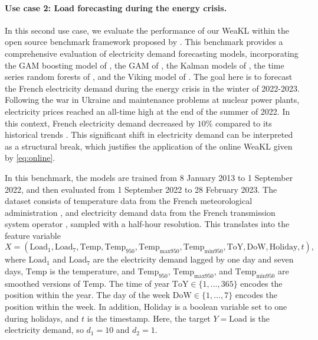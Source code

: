 \paragraph{Use case 2: Load forecasting during the energy crisis.}
In this second use case, we evaluate the performance of our WeaKL within the open source benchmark framework proposed by \citet{doumeche2023human}. This benchmark provides a comprehensive evaluation of electricity demand forecasting models, incorporating the GAM boosting model of \cite{bentaieb2014a}, the GAM of \cite{obst2021adaptive}, the Kalman models of \cite{vilmarest2022state}, the time series random forests of \cite{gohery2023random}, and the Viking model of \cite{Vilamarest2024adaptive}. 
The goal here is to forecast the French electricity demand during the energy crisis in the winter of 2022-2023. Following the war in Ukraine and maintenance problems at nuclear power plants, electricity prices reached an all-time high at the end of the summer of 2022. In this context, French electricity demand decreased by $10\%$ compared to its historical trends \citep{doumeche2023human}. 
This significant shift in electricity demand can be interpreted as a structural break, which justifies the application of the online WeaKL given by \eqref{eq:online}.

In this benchmark, the models are trained from 8 January 2013 to 1 September 2022, and then evaluated from 1 September 2022 to 28 February 2023.
The dataset consists of temperature data from the French meteorological administration \citet{meteoFrance}, and electricity demand data from the French  transmission system operator \citet{rteData}, sampled with a half-hour resolution.  
This translates into the feature variable 
\[X =(\mathrm{Load}_1, \mathrm{Load}_7, \mathrm{Temp}, \mathrm{Temp}_{950},  \mathrm{Temp}_{\mathrm{max 950}}, \mathrm{Temp}_{\mathrm{min 950}}, \mathrm{ToY},  \mathrm{DoW}, \mathrm{Holiday},t),
\]
where $\mathrm{Load}_1$ and $\mathrm{Load}_7$ are the electricity demand lagged by one day and seven days, $\mathrm{Temp}$ is the temperature, and $\mathrm{Temp}_{950}$,  $\mathrm{Temp}_{\mathrm{max 950}}$, and $\mathrm{Temp}_{\mathrm{min 950}}$ are smoothed versions of $\mathrm{Temp}$. The time of year $\mathrm{ToY} \in \{1, \hdots, 365\}$ encodes the position within the year. 
The day of the week $\mathrm{DoW} \in \{1, \hdots, 7\}$ encodes the position within the week. 
In addition, $\mathrm{Holiday}$ is a boolean variable set to one during holidays, and $t$ is the timestamp. 
Here, the target $Y = \mathrm{Load}$ is the electricity demand, so $d_1 = 10$ and $d_2 = 1$.


